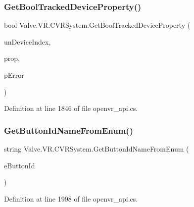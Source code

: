 \mbox{\label{class_valve_1_1_v_r_1_1_c_v_r_system_af4e5f993f956f6a825bafb95f8c1f680}} 
\subsubsection{\texorpdfstring{GetBoolTrackedDeviceProperty()}{GetBoolTrackedDeviceProperty()}}
{\footnotesize\ttfamily bool Valve.\+V\+R.\+C\+V\+R\+System.\+Get\+Bool\+Tracked\+Device\+Property (\begin{DoxyParamCaption}\item[{uint}]{un\+Device\+Index,  }\item[{\mbox{\hyperlink{namespace_valve_1_1_v_r_ab060521ead7273986988fc4897e52482}{E\+Tracked\+Device\+Property}}}]{prop,  }\item[{ref \mbox{\hyperlink{namespace_valve_1_1_v_r_aab6684f03930a2d2cf22ed66b437e47b}{E\+Tracked\+Property\+Error}}}]{p\+Error }\end{DoxyParamCaption})}



Definition at line 1846 of file openvr\+\_\+api.\+cs.

\mbox{\label{class_valve_1_1_v_r_1_1_c_v_r_system_acf572436320e18e574af8435fdb34c7a}} 
\subsubsection{\texorpdfstring{GetButtonIdNameFromEnum()}{GetButtonIdNameFromEnum()}}
{\footnotesize\ttfamily string Valve.\+V\+R.\+C\+V\+R\+System.\+Get\+Button\+Id\+Name\+From\+Enum (\begin{DoxyParamCaption}\item[{\mbox{\hyperlink{namespace_valve_1_1_v_r_a43fd11be1f2f7596cbb480b4a5dc2e87}{E\+V\+R\+Button\+Id}}}]{e\+Button\+Id }\end{DoxyParamCaption})}



Definition at line 1998 of file openvr\+\_\+api.\+cs.


